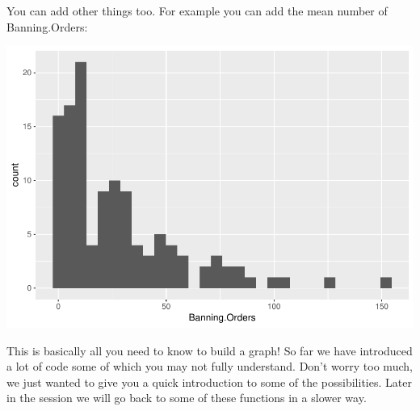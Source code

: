 \documentclass[]{book}
\newenvironment{Shaded}{\begin{snugshade}}{\end{snugshade}}
\newcommand{\CommentTok}[1]{\textcolor[rgb]{0.56,0.35,0.01}{\textit{#1}}}
\newcommand{\DataTypeTok}[1]{\textcolor[rgb]{0.13,0.29,0.53}{#1}}
\newcommand{\DecValTok}[1]{\textcolor[rgb]{0.00,0.00,0.81}{#1}}
\newcommand{\KeywordTok}[1]{\textcolor[rgb]{0.13,0.29,0.53}{\textbf{#1}}}
\newcommand{\NormalTok}[1]{#1}
\newcommand{\OperatorTok}[1]{\textcolor[rgb]{0.81,0.36,0.00}{\textbf{#1}}}
\newcommand{\StringTok}[1]{\textcolor[rgb]{0.31,0.60,0.02}{#1}}
\theoremstyle{definition}
\theoremstyle{definition}
\theoremstyle{definition}
\theoremstyle{remark}
\begin{document}
You can add other things too. For example you can add the mean number of
Banning.Orders:

\begin{Shaded}
\end{Shaded}

\includegraphics{03-visualisation_files/figure-latex/unnamed-chunk-9-1.pdf}

This is basically all you need to know to build a graph! So far we have
introduced a lot of code some of which you may not fully understand.
Don't worry too much, we just wanted to give you a quick introduction to
some of the possibilities. Later in the session we will go back to some
of these functions in a slower way.
\end{document}
